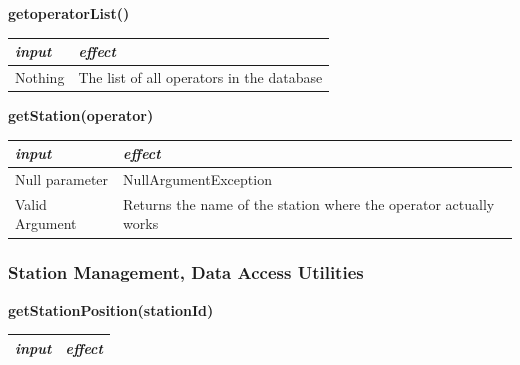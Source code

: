 \documentclass{article}
\begin{document}
\begin{flushleft}
   
  \begin{center}
   \begin {flushleft}
    \textbf{getoperatorList()}
    \end{flushleft}
        \begin{tabular}{  |  p{6cm} | p{6cm} |}
    \hline
    \textit{input} &  \textit{effect} \\
    \hline
    
    Nothing & The list of all operators in the database
     \\ 
  \hline
 
    \end{tabular}
\end{center}



   
  \begin{center}
   \begin {flushleft}
    \textbf{getStation(operator)}
    \end{flushleft}
        \begin{tabular}{  |  p{6cm} | p{6cm} |}
    \hline
    \textit{input} &  \textit{effect} \\
    \hline
    
    Null parameter & NullArgumentException
     \\ 
  \hline
   Valid Argument & Returns the name of the station where the operator actually works \\
  \hline
 
    \end{tabular}
\end{center}
    
    
    
    
     
     
     
     
     
     
      \subsubsection{Station Management, Data Access Utilities}
      
      
        \begin{center}
   \begin {flushleft}
    \textbf{getStationPosition(stationId)}
    \end{flushleft}
        \begin{tabular}{  |  p{6cm} | p{6cm} |}
    \hline
    \textit{input} &  \textit{effect} \\
    \hline
    

\end{tabular}
\end{center}
\end{flushleft}
\end{document}
